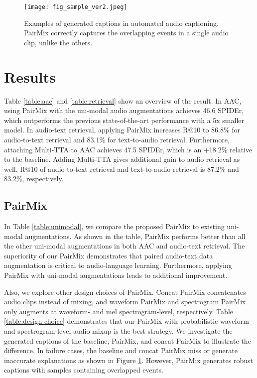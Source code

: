 \documentclass{INTERSPEECH2023}
\begin{document}
\begin{figure}
    \centering
    \texttt{[image: fig\_sample\_ver2.jpeg]}
    \caption{Examples of generated captions in automated audio captioning. PairMix correctly captures the overlapping events in a single audio clip, unlike the others.}
    \label{fig:fig_sample}
\end{figure}

\section{Results}
\label{sec:majhead}
Table \ref{table:aac} and \ref{table:retrieval} show an overview of the result. In AAC, using PairMix with the uni-modal audio augmentations achieves 46.6 SPIDEr, which outperforms the previous state-of-the-art performance with a 5x smaller model. In audio-text retrieval, applying PairMix increases R@10 to 86.8\% for audio-to-text retrieval and 83.1\% for text-to-audio retrieval. Furthermore, attaching Multi-TTA to AAC achieves 47.5 SPIDEr, which is an +18.2\% relative to the baseline. Adding Multi-TTA gives additional gain to audio retrieval as well, R@10 of audio-to-text retrieval and text-to-audio retrieval is 87.2\% and 83.2\%, respectively. 

\subsection{PairMix}
In Table \ref{table:unimodal}, we compare the proposed PairMix to existing uni-modal augmentations. As shown in the table, PairMix performs better than all the other uni-modal augmentations in both AAC and audio-text retrieval. The superiority of our PairMix demonstrates that paired audio-text data augmentation is critical to audio-language learning.  Furthermore, applying PairMix with uni-modal augmentations leads to additional improvement. 

Also, we explore other design choices of PairMix. Concat PairMix concatenates audio clips instead of mixing, and waveform PairMix and spectrogram PairMix only augments at waveform- and mel spectrogram-level, respectively. Table \ref{table:design-choice} demonstrates that our PairMix with probabilistic waveform- and spectrogram-level audio mixup is the best strategy. We investigate the generated captions of the baseline, PairMix, and concat PairMix to illustrate the difference. In failure cases, the baseline and concat PairMix miss or generate inaccurate explanations as shown in Figure \ref{fig:fig_sample}. However, PairMix generates robust captions with samples containing overlapped events.
\end{document}
